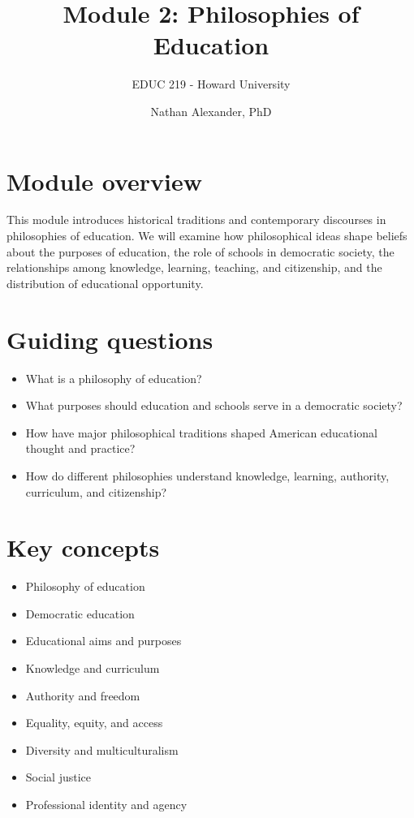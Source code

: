 \documentclass[
  letterpaper,
  DIV=11,
  numbers=noendperiod]{scrartcl}
\title{Module 2: Philosophies of Education}
\subtitle{EDUC 219 - Howard University}
\author{Nathan Alexander, PhD}
\date{}
\providecommand{\tightlist}{%
  \setlength{\itemsep}{0pt}\setlength{\parskip}{0pt}}\usepackage{longtable,booktabs,array}
\renewcommand*\contentsname{Table of contents}
\newcommand\contentsname{Table of contents}
\begin{document}
\maketitle

\renewcommand*\contentsname{Table of contents}
{
\hypersetup{linkcolor=}
\setcounter{tocdepth}{3}
\tableofcontents
}

\section{Module overview}\label{module-overview}

This module introduces historical traditions and contemporary discourses
in philosophies of education. We will examine how philosophical ideas
shape beliefs about the purposes of education, the role of schools in
democratic society, the relationships among knowledge, learning,
teaching, and citizenship, and the distribution of educational
opportunity.

\section{Guiding questions}\label{guiding-questions}

\begin{itemize}
\tightlist
\item
  What is a philosophy of education?
\item
  What purposes should education and schools serve in a democratic
  society?
\item
  How have major philosophical traditions shaped American educational
  thought and practice?
\item
  How do different philosophies understand knowledge, learning,
  authority, curriculum, and citizenship?
\end{itemize}

\section{Key concepts}\label{key-concepts}

\begin{itemize}
\tightlist
\item
  Philosophy of education
\item
  Democratic education
\item
  Educational aims and purposes
\item
  Knowledge and curriculum
\item
  Authority and freedom
\item
  Equality, equity, and access
\item
  Diversity and multiculturalism
\item
  Social justice
\item
  Professional identity and agency
\end{itemize}
\end{document}
